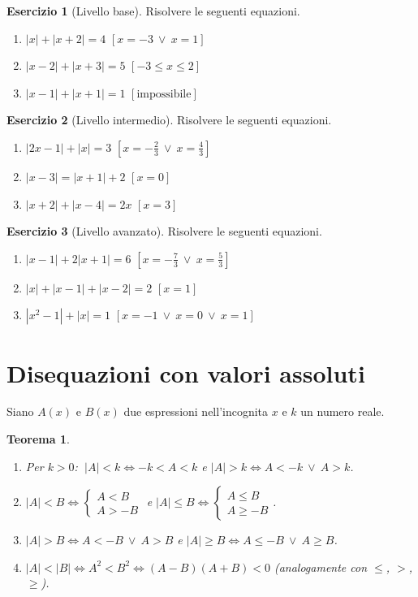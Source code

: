 \documentclass[12pt,a4paper,openany]{book}
\theoremstyle{definition}
\newtheorem{esercizio}{Esercizio}[section]
\theoremstyle{plain}
\newtheorem{teorema}{Teorema}[section]
\theoremstyle{remark}
\newcommand{\abs}[1]{\left|#1\right|}
\newcommand{\sistema}[1]{\begin{cases}#1\end{cases}}
\begin{document}
\begin{esercizio}[Livello base]
Risolvere le seguenti equazioni.
\begin{enumerate}[label=\alph*)]
\item $\abs{x}+\abs{x+2}=4$ \hfill $[x=-3\ \lor\ x=1]$
\item $\abs{x-2}+\abs{x+3}=5$ \hfill $[-3\le x\le 2]$
\item $\abs{x-1}+\abs{x+1}=1$ \hfill $[\text{impossibile}]$
\end{enumerate}
\end{esercizio}

\begin{esercizio}[Livello intermedio]
Risolvere le seguenti equazioni.
\begin{enumerate}[label=\alph*)]
\item $\abs{2x-1}+\abs{x}=3$ \hfill $[x=-\tfrac23\ \lor\ x=\tfrac43]$
\item $\abs{x-3}=\abs{x+1}+2$ \hfill $[x=0]$
\item $\abs{x+2}+\abs{x-4}=2x$ \hfill $[x=3]$
\end{enumerate}
\end{esercizio}

\begin{esercizio}[Livello avanzato]
Risolvere le seguenti equazioni.
\begin{enumerate}[label=\alph*)]
\item $\abs{x-1}+2\abs{x+1}=6$ \hfill $[x=-\tfrac73\ \lor\ x=\tfrac53]$
\item $\abs{x}+\abs{x-1}+\abs{x-2}=2$ \hfill $[x=1]$
\item $\abs{x^2-1}+\abs{x}=1$ \hfill $[x=-1\ \lor\ x=0\ \lor\ x=1]$
\end{enumerate}
\end{esercizio}

\section{Disequazioni con valori assoluti}

Siano $A(x)$ e $B(x)$ due espressioni nell'incognita $x$ e $k$ un numero reale.

\begin{teorema}
\begin{enumerate}[label=\arabic*)]
\item Per $k>0$: $\ \abs{A}<k\iff -k<A<k$ \quad e \quad $\abs{A}>k\iff A<-k\ \lor\ A>k$.
\item $\abs{A}<B\iff \sistema{A<B\\ A>-B}$ \quad e \quad $\abs{A}\le B\iff \sistema{A\le B\\ A\ge -B}$.
\item $\abs{A}>B\iff A<-B\ \lor\ A>B$ \quad e \quad $\abs{A}\ge B\iff A\le -B\ \lor\ A\ge B$.
\item $\abs{A}<\abs{B}\iff A^2<B^2\iff (A-B)(A+B)<0$ \quad (analogamente con $\le$, $>$, $\ge$).
\end{enumerate}
\end{teorema}
\end{document}
